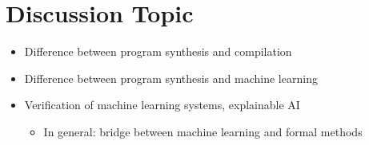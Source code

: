 \documentclass[notes=hide]{beamer}
\begin{document}
\section{Discussion Topic}

\begin{frame}{\secname}
  \begin{itemize}
  \item Difference between program synthesis and compilation
  \item Difference between program synthesis and machine learning
  \item Verification of machine learning systems, explainable AI
    \begin{itemize}
    \item In general: bridge between machine learning and formal methods
    \end{itemize}
  \end{itemize}
\end{frame}
\end{document}

